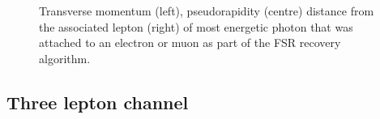\begin{figure}
%
%
\caption{Transverse momentum (left), pseudorapidity (centre) distance from the associated lepton (right)
of most energetic photon that was attached to an electron or muon as part of the FSR recovery algorithm.}
\label{fig:Run2_SR4P_fsrPhotons}
\end{figure}

\subsection{Three lepton channel}


